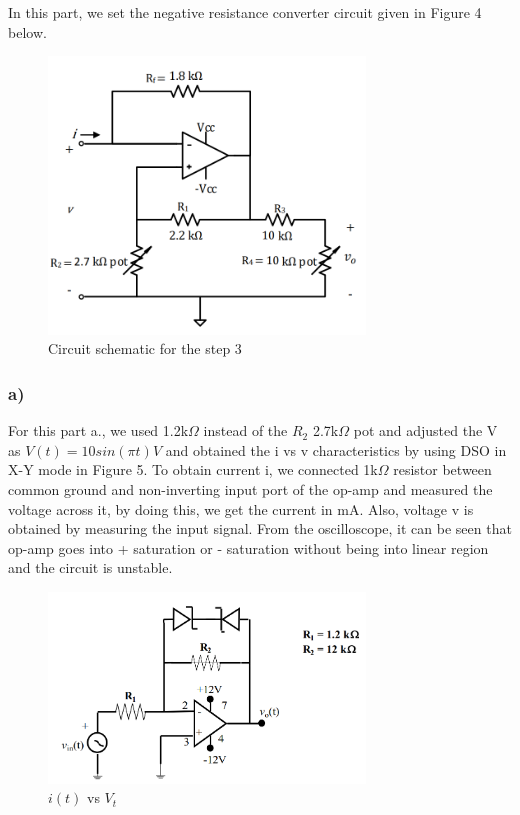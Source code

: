 \documentclass[letterpaper,12pt]{article}
\begin{document}
In this part, we set the negative resistance converter circuit given in Figure 4 below.
\begin{figure}[H]
    \centering
    \includegraphics[width = 0.75\textwidth]{3SCH.png}
    \caption{Circuit schematic for the step 3}
\end{figure} 

  
\subsubsection{a)}
For this part a., we used 1.2k\(\Omega\) instead of the \(R_2\) 2.7k\(\Omega\) pot and adjusted the V as \(V(t) = 10sin(\pi t)V\) and obtained the i vs v characteristics by using DSO in X-Y mode in Figure 5. To obtain current i, we connected 1k\(\Omega\) resistor between common ground and non-inverting input port of the op-amp and measured the voltage across it, by doing this, we get the current in mA. Also, voltage v is obtained by measuring the input signal. From the oscilloscope, it can be seen that op-amp goes into + saturation or - saturation without being into linear region and the circuit is unstable.
\begin{figure}[H]
    \centering
    \includegraphics[width = 0.75\textwidth]{2SCH.png}
    \caption{\(i(t)\) vs \(V_{t}\)}
\end{figure} 
\end{document}
